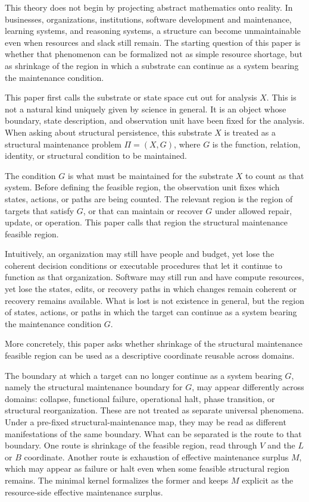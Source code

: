\documentclass[12pt,a4paper]{article}
\begin{document}
This theory does not begin by projecting abstract mathematics onto reality. In businesses, organizations, institutions, software development and maintenance, learning systems, and reasoning systems, a structure can become unmaintainable even when resources and slack still remain. The starting question of this paper is whether that phenomenon can be formalized not as simple resource shortage, but as shrinkage of the region in which a substrate can continue as a system bearing the maintenance condition.

This paper first calls the substrate or state space cut out for analysis \(X\). This is not a natural kind uniquely given by science in general. It is an object whose boundary, state description, and observation unit have been fixed for the analysis. When asking about structural persistence, this substrate \(X\) is treated as a structural maintenance problem \(\Pi=(X,G)\), where \(G\) is the function, relation, identity, or structural condition to be maintained.

The condition \(G\) is what must be maintained for the substrate \(X\) to count as that system. Before defining the feasible region, the observation unit fixes which states, actions, or paths are being counted. The relevant region is the region of targets that satisfy \(G\), or that can maintain or recover \(G\) under allowed repair, update, or operation. This paper calls that region the structural maintenance feasible region.

Intuitively, an organization may still have people and budget, yet lose the coherent decision conditions or executable procedures that let it continue to function as that organization. Software may still run and have compute resources, yet lose the states, edits, or recovery paths in which changes remain coherent or recovery remains available. What is lost is not existence in general, but the region of states, actions, or paths in which the target can continue as a system bearing the maintenance condition \(G\).

More concretely, this paper asks whether shrinkage of the structural maintenance feasible region can be used as a descriptive coordinate reusable across domains.

The boundary at which a target can no longer continue as a system bearing \(G\), namely the structural maintenance boundary for \(G\), may appear differently across domains: collapse, functional failure, operational halt, phase transition, or structural reorganization. These are not treated as separate universal phenomena. Under a pre-fixed structural-maintenance map, they may be read as different manifestations of the same boundary. What can be separated is the route to that boundary. One route is shrinkage of the feasible region, read through \(V\) and the \(L\) or \(B\) coordinate. Another route is exhaustion of effective maintenance surplus \(M\), which may appear as failure or halt even when some feasible structural region remains. The minimal kernel formalizes the former and keeps \(M\) explicit as the resource-side effective maintenance surplus.
\end{document}
